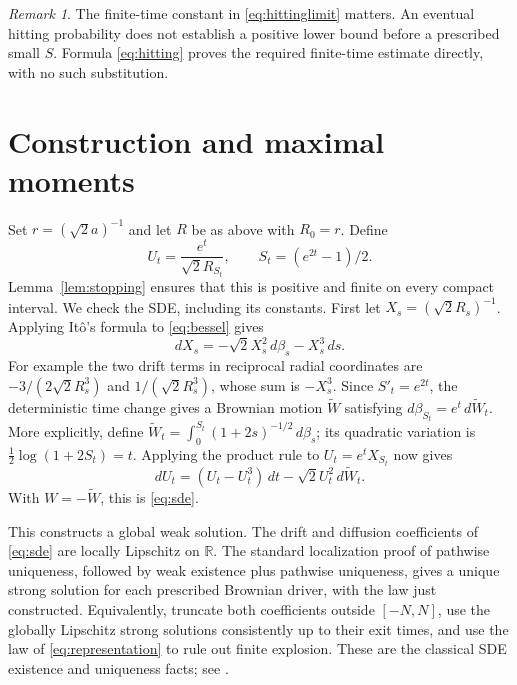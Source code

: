 \documentclass[11pt]{article}
\theoremstyle{remark}\newtheorem{remark}[theorem]{Remark}
\newcommand{\R}{\mathbb R}\newcommand{\T}{\mathbb T}
\begin{document}
\begin{remark}
The finite-time constant in \eqref{eq:hittinglimit} matters. An eventual hitting probability does not establish a positive lower bound before a prescribed small $S$. Formula \eqref{eq:hitting} proves the required finite-time estimate directly, with no such substitution.
\end{remark}

\section{Construction and maximal moments}
Set $r=(\sqrt2 a)^{-1}$ and let $R$ be as above with $R_0=r$. Define
\begin{equation}\label{eq:representation}
 U_t=\frac{e^t}{\sqrt2 R_{S_t}},\qquad S_t=(e^{2t}-1)/2.
\end{equation}
Lemma~\ref{lem:stopping} ensures that this is positive and finite on every compact interval. We check the SDE, including its constants. First let $X_s=(\sqrt2 R_s)^{-1}$. Applying It\^o's formula to \eqref{eq:bessel} gives
\[
 dX_s=-\sqrt2 X_s^2\,d\beta_s-X_s^3\,ds.
\]
For example the two drift terms in reciprocal radial coordinates are
$-3/(2\sqrt2 R_s^3)$ and $1/(\sqrt2 R_s^3)$, whose sum is $-X_s^3$. Since $S'_t=e^{2t}$, the deterministic time change gives a Brownian motion $\widetilde W$ satisfying $d\beta_{S_t}=e^t\,d\widetilde W_t$. More explicitly, define
$\widetilde W_t=\int_0^{S_t}(1+2s)^{-1/2}\,d\beta_s$; its quadratic variation is $\frac12\log(1+2S_t)=t$. Applying the product rule to $U_t=e^tX_{S_t}$ now gives
\[
 dU_t=(U_t-U_t^3)\,dt-\sqrt2 U_t^2\,d\widetilde W_t.
\]
With $W=-\widetilde W$, this is \eqref{eq:sde}.

This constructs a global weak solution. The drift and diffusion coefficients of \eqref{eq:sde} are locally Lipschitz on $\R$. The standard localization proof of pathwise uniqueness, followed by weak existence plus pathwise uniqueness, gives a unique strong solution for each prescribed Brownian driver, with the law just constructed. Equivalently, truncate both coefficients outside $[-N,N]$, use the globally Lipschitz strong solutions consistently up to their exit times, and use the law of \eqref{eq:representation} to rule out finite explosion. These are the classical SDE existence and uniqueness facts; see \cite{RY}.
\end{document}
